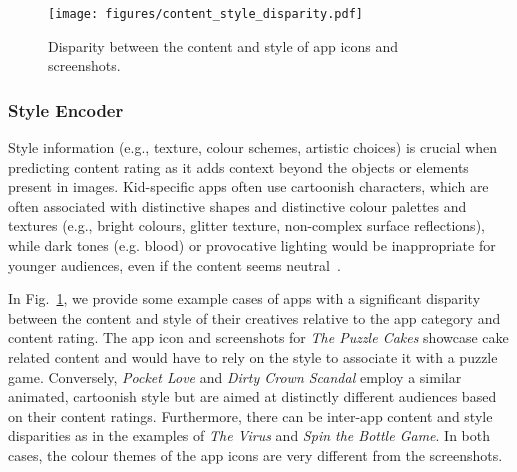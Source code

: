 \begin{figure}[th]
    \centering
    \texttt{[image: figures/content\_style\_disparity.pdf]}
    \caption{Disparity between the content and style of app icons and screenshots.}
    \label{fig:style_content_difference}
\end{figure}


\subsubsection{Style Encoder}
\label{sec:style_enc}

Style information (e.g., texture, colour schemes, artistic choices) is crucial when predicting content rating as it adds context beyond the objects or elements present in images.
Kid-specific apps often use cartoonish characters, which are often associated with distinctive shapes and distinctive colour palettes and textures (e.g., bright colours, glitter texture, non-complex surface reflections), while dark tones (e.g. blood) or provocative lighting would be inappropriate for younger audiences, even if the content seems neutral~\cite{liu2016identifying}.


In Fig.~\ref{fig:style_content_difference}, we provide some example cases of apps with a significant disparity between the content and style of their creatives relative to the app category and content rating. The app icon and screenshots for \emph{The Puzzle Cakes} showcase cake related content and would have to rely on the style to associate it with a puzzle game. Conversely, \emph{Pocket Love} and \emph{Dirty Crown Scandal} employ a similar animated, cartoonish style but are aimed at distinctly different audiences based on their content ratings. Furthermore, there can be inter-app content and style disparities as in the examples of  \emph{The Virus} and \emph{Spin the Bottle Game}. In both cases, the colour themes of the app icons are very different from the screenshots.  

